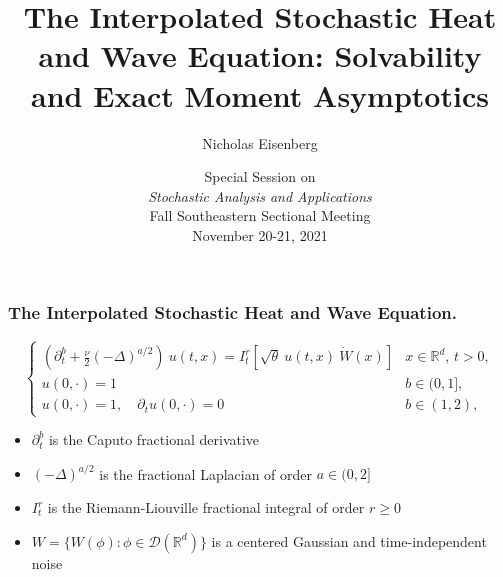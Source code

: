 \documentclass{beamer}%
\title[About Beamer] %
{The Interpolated Stochastic Heat and Wave Equation: Solvability and Exact Moment Asymptotics}
\author[Arthur, Doe] %
{Nicholas Eisenberg}
\institute[Auburn University]
{
\pgfuseimage{AU}\\[3em]
 \vspace{2em}
}
\date[VLC 2021] %
{ \small Special Session on \\
	{\it Stochastic Analysis and Applications}\\[1em]
	Fall Southeastern Sectional Meeting\\[0.5em]
	November 20-21, 2021}
\numberwithin{equation}{section}
\newcommand{\R}{\mathbb{R}}
\begin{document}
	\frame{\titlepage}
	\setcounter{page}{1}

	\begin{frame}[t]
		\frametitle{The Interpolated Stochastic Heat and Wave Equation.}

		\begin{equation*}
		\begin{cases}
		\left(\partial^b_t + \frac{\nu}{2}(-\Delta)^{a/2}\right)\: u(t,x) = I^r_t \left[\sqrt{\theta}\: u(t,x)\: \dot W(x) \right] & \text{$x\in \R^d$, $t>0$}, \\
		u(0,\cdot) = 1                                                                                                             & b \in (0,1],               \\
		u(0,\cdot) = 1, \quad \partial_t u(0,\cdot) = 0                                                                            & b \in (1,2),
		\end{cases}
		\end{equation*}


		\begin{itemize}
			\item $\partial^b_t$ is the Caputo fractional derivative
			\item $(-\Delta)^{a/2}$ is the fractional Laplacian of order $a \in (0,2]$
			\item $I^r_t$ is the Riemann-Liouville fractional integral of order $r \ge 0$
			\item $W = \{ W(\phi) : \phi \in \mathcal{D}(\R^d) \}$ is a centered Gaussian and time-independent noise
		\end{itemize}

	\end{frame}
\end{document}
